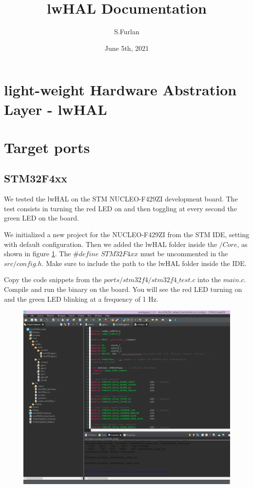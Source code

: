 \documentclass[letterpaper,10pt,english]{hitec}
\title{lwHAL Documentation}
\date{June 5th, 2021}
\author{S.Furlan}
\begin{document}
\maketitle
\blinddocument
\newpage

\tableofcontents

\newpage

\section{light-weight Hardware Abstration Layer - lwHAL}

\newpage

\section{Target ports}
\subsection{STM32F4xx}
We tested the lwHAL on the STM NUCLEO-F429ZI development board. The test consists
in turning the red LED on and then toggling at every second the green LED on the board.

We initialized a new project for the NUCLEO-F429ZI from the STM IDE, setting
with default configuration. Then we added the lwHAL folder inside the $/Core$, as
shown in figure \ref{fig:stm_ide}.
The $\#define$ $STM32F4xx$ must be uncommented in the $src/config.h$.
Make sure to include the path to the lwHAL folder inside the IDE.

Copy the code snippets from the
$ports/stm32f4/stm32f4\_test.c$
into the $main.c$.
Compile and run the binary on the board. You will see the red LED turning on and
the green LED blinking at a frequency of 1 Hz.

\begin{figure}[ht]
\centering
\includegraphics[scale=0.4]{stm_ide.png}
\label{fig:stm_ide}
\end{figure}
\end{document}

